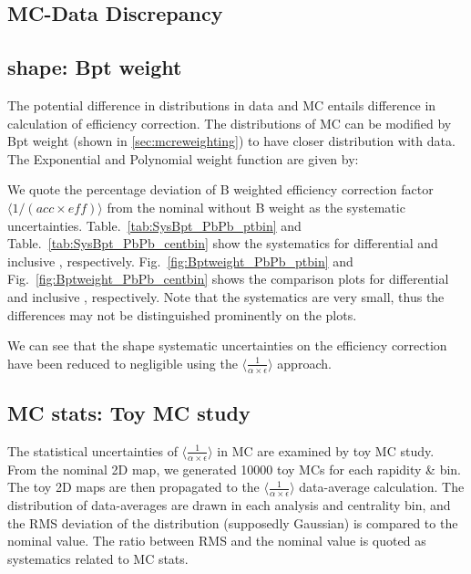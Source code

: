 \clearpage









\subsection{MC-Data Discrepancy}






\clearpage

\subsection{\pt shape: Bpt weight}
The potential difference in \pt distributions in data and MC entails difference in calculation of efficiency correction. The \Bplus \pt distributions of MC can be modified by Bpt weight (shown in \ref{sec:mcreweighting}) to have closer distribution with data.  The Exponential and Polynomial weight function are given by:


\clearpage


We quote the percentage deviation of B \pt weighted efficiency correction factor  $\langle 1/(acc \times eff) \rangle$ from the nominal without B \pt weight as the systematic uncertainties. Table.~\ref{tab:SysBpt_PbPb_ptbin} and Table.~\ref{tab:SysBpt_PbPb_centbin} show the systematics for differential \pt and inclusive \pt, respectively.
Fig.~\ref{fig:Bptweight_PbPb_ptbin} and Fig.~\ref{fig:Bptweight_PbPb_centbin} shows the comparison plots for differential \pt and inclusive \pt, respectively. Note that the systematics are very small, thus the differences may not be distinguished prominently on the plots.


We can see that the \pt shape systematic uncertainties on the efficiency correction have been reduced to negligible using the $\langle \frac{1}{\alpha \times \epsilon} \rangle$ approach. 

\clearpage

\subsection{MC stats: Toy MC study}
The statistical uncertainties of $\langle \frac{1}{\alpha \times \epsilon} \rangle$ in MC are examined by toy MC study. From the nominal 2D map, we generated 10000 toy MCs for each rapidity & \pt bin. The toy 2D maps are then propagated to the $\langle \frac{1}{\alpha \times \epsilon} \rangle$ data-average calculation. The distribution of data-averages are drawn in each analysis \pt and centrality bin, and the RMS deviation of the distribution (supposedly Gaussian) is compared to the nominal value. The ratio between RMS and the nominal value is quoted as systematics related to MC stats. \\

